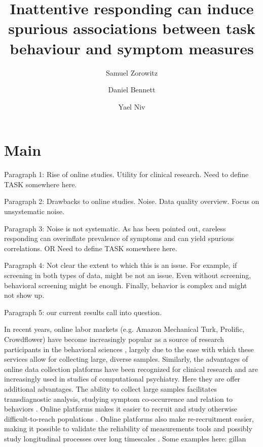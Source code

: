 \documentclass[a4paper,notitlepage,12pt]{article}
\author[1]{Samuel Zorowitz}
\author[1,2]{Daniel Bennett}
\author[1,3]{Yael Niv}
\affil[1]{Princeton Neuroscience Institute, Princeton University, USA}
\affil[2]{Department of Psychiatry, Monash University, Australia}
\affil[3]{Department of Psychology, Princeton University, USA}
\title{Inattentive responding can induce spurious associations between task behaviour and symptom measures}
\date{}
\begin{document}
\maketitle


\clearpage

\setlength{\parindent}{0em}
\setlength{\parskip}{1em}

\section{Main}

Paragraph 1: Rise of online studies. Utility for clinical research. Need to define TASK somewhere here.

Paragraph 2: Drawbacks to online studies. Noise. Data quality overview. Focus on unsystematic noise.

Paragraph 3: Noise is not systematic. As has been pointed out, careless responding can overinflate prevalence of symptoms and can yield spurious correlations. OR Need to define TASK somewhere here.

Paragraph 4: Not clear the extent to which this is an issue. For example, if screening in both types of data, might be not an issue. Even without screening, behavioral screening might be enough. Finally, behavior is complex and might not show up.

Paragraph 5: our current results call into question.

In recent years, online labor markets (e.g. Amazon Mechanical Turk, Prolific, Crowdflower) have become increasingly popular as a source of research participants in the behavioral sciences \cite{stewart2017crowdsourcing}, largely due to the ease with which these services allow for collecting large, diverse samples. Similarly, the advantages of online data collection platforms have been recognized for clinical research \cite{chandler2016conducting} and are increasingly used in studies of computational psychiatry. Here they are offer additional advantages. The ability to collect large samples facilitates transdiagnostic analysis, studying symptom co-occurrence and relation to behaviors \cite{gillan2016taking, rutledge2019machine}. Online platforms makes it easier to recruit and study otherwise difficult-to-reach populations \cite{strickland2019use}. Online platforms also make re-recruitment easier, making it possible to validate the reliability of measurements tools \cite{enkavi2019large} and possibly study longitudinal processes over long timescales \cite{kothe2019retention}. Some examples here: gillan
\end{document}
